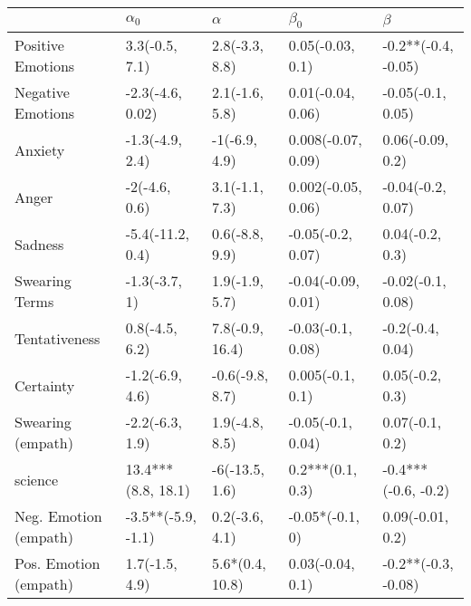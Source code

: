 \begin{tabular}{lllll}
\toprule
{} &          $\alpha_0$ &         $\alpha$ &           $\beta_0$ &              $\beta$ \\
\midrule
Positive Emotions     &      3.3(-0.5, 7.1) &   2.8(-3.3, 8.8) &    0.05(-0.03, 0.1) &  -0.2**(-0.4, -0.05) \\
Negative Emotions     &    -2.3(-4.6, 0.02) &   2.1(-1.6, 5.8) &   0.01(-0.04, 0.06) &    -0.05(-0.1, 0.05) \\
Anxiety               &     -1.3(-4.9, 2.4) &    -1(-6.9, 4.9) &  0.008(-0.07, 0.09) &     0.06(-0.09, 0.2) \\
Anger                 &       -2(-4.6, 0.6) &   3.1(-1.1, 7.3) &  0.002(-0.05, 0.06) &    -0.04(-0.2, 0.07) \\
Sadness               &    -5.4(-11.2, 0.4) &   0.6(-8.8, 9.9) &   -0.05(-0.2, 0.07) &      0.04(-0.2, 0.3) \\
Swearing Terms        &       -1.3(-3.7, 1) &   1.9(-1.9, 5.7) &  -0.04(-0.09, 0.01) &    -0.02(-0.1, 0.08) \\
Tentativeness         &      0.8(-4.5, 6.2) &  7.8(-0.9, 16.4) &   -0.03(-0.1, 0.08) &     -0.2(-0.4, 0.04) \\
Certainty             &     -1.2(-6.9, 4.6) &  -0.6(-9.8, 8.7) &    0.005(-0.1, 0.1) &      0.05(-0.2, 0.3) \\
Swearing (empath)     &     -2.2(-6.3, 1.9) &   1.9(-4.8, 8.5) &   -0.05(-0.1, 0.04) &      0.07(-0.1, 0.2) \\
science               &  13.4***(8.8, 18.1) &   -6(-13.5, 1.6) &    0.2***(0.1, 0.3) &  -0.4***(-0.6, -0.2) \\
Neg. Emotion (empath) &  -3.5**(-5.9, -1.1) &   0.2(-3.6, 4.1) &     -0.05*(-0.1, 0) &     0.09(-0.01, 0.2) \\
Pos. Emotion (empath) &      1.7(-1.5, 4.9) &  5.6*(0.4, 10.8) &    0.03(-0.04, 0.1) &  -0.2**(-0.3, -0.08) \\
\bottomrule
\end{tabular}
